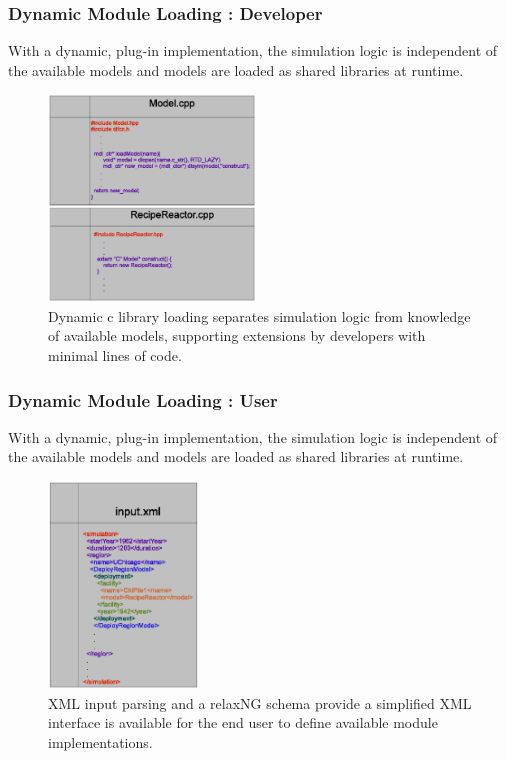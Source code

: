 \begin{frame}
  \frametitle{Dynamic Module Loading : Developer}
  With a dynamic, plug-in implementation, the simulation logic is 
  independent of the available models and models are loaded as shared 
  libraries at runtime. 

  \begin{figure}[htbp!]
    \begin{center}
      \includegraphics[height=5.5cm]{developer.eps}
    \end{center}
    \caption{Dynamic c library loading separates simulation logic from 
    knowledge of available models, supporting extensions by developers 
    with minimal lines of code.}
    \label{fig:xmlinput}
  \end{figure}

\end{frame}
\begin{frame}[ctb!]
  \frametitle{Dynamic Module Loading : User}
  With a dynamic, plug-in implementation, the simulation logic is 
  independent of the available models and models are loaded as shared 
  libraries at runtime. 

  \begin{figure}[htbp!]
    \begin{center}
      \includegraphics[height=5.5cm]{user.eps}
    \end{center}
    \caption { XML input parsing and a relaxNG schema provide 
    a simplified XML interface is available for the end
    user to define available module implementations.  }
    \label{fig:xmlinput}
  \end{figure}

\end{frame}

